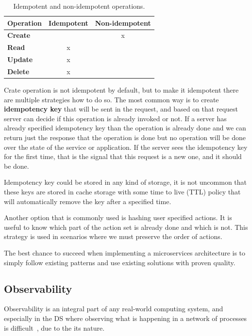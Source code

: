 \begin{table}[h!]
	\begin{center}
		\begin{tabular}{l|c|c}
			\textbf{Operation} & \textbf{Idempotent} & \textbf{Non-idempotent}\\
			\hline
			\textbf{Create} &  & x \\
			\textbf{Read} & x & \\
			\textbf{Update} & x & \\
			\textbf{Delete} & x & \\
		\end{tabular}
	\end{center}
	\vspace{-0.5cm}
	\caption{Idempotent and non-idempotent operations.}
	\label{tab:table8}
\end{table}

\noindent
Crate operation is not idempotent by default, but to make it idempotent there are multiple strategies how to do so. The most common way is to create \textbf{idempotency key} that will be sent in the request, and based on that request server can decide if this operation is already invoked or not. If a server has already  specified idempotency key than the operation is already done and we can return just the response that the operation is done but no operation will be done over the state of the service or application. If the server sees the idempotency key for the first time, that is the signal that this request is a new one, and it should be done.

Idempotency key could be stored in any kind of storage, it is not uncommon that these keys are stored in cache storage with some time to live (TTL) policy that will automatically remove the key after a specified time.

Another option that is commonly used is hashing user specified actions. It is useful to know which part of the action set is already done and which is not. This strategy is used in scenarios where we must preserve the order of actions.

The best chance to succeed when implementing a microservices architecture is to simply follow existing patterns and use existing solutions with proven quality.
%
%
\subsection{Observability}\label{sec:log_aggregation}
%
Observability is an integral part of any real-world computing system, and especially in the DS where observing what is happening in a network of processes is difficult~\cite{Fidge96}, due to the its nature.

